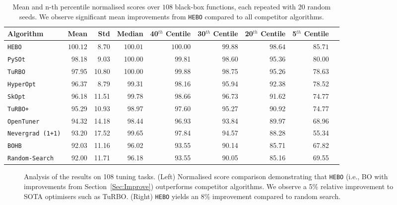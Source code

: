 \documentclass[jair,twoside,11pt,theapa]{article}
\theoremstyle{definition}
\begin{document}
    \begin{table}[t!]
    \centering
\begin{tabular}{lrrrrrrrr}
\toprule
      Algorithm &    Mean &    Std &     Median &     40$^{th}$ Centile &    30$^{th}$ Centile &    20$^{th}$ Centile &  5$^{th}$ Centile \\
\midrule
          \texttt{HEBO} &  $\bm{100.12}$ &   $\bm{8.70}$ &  $\bm{100.01}$ &  $\bm{100.00}$ &  $\bm{99.88}$ &  $\bm{98.64}$ &  $\bm{85.71}$ \\
          \texttt{PySOt} &   98.18 &   9.03 &  100.00 &   99.81 &  98.60 &  95.36 &  80.00 \\
          \texttt{TuRBO} &   97.95 &  10.80 &  100.00 &   99.88 &  98.75 &  95.26 &  78.63 \\
       \texttt{HyperOpt} &   96.37 &   8.79 &   99.31 &   98.16 &  95.94 &  92.38 &   78.52 \\
          \texttt{SkOpt} &   96.18 &  11.51 &   99.78 &   98.66 &  96.73 &  91.62 &  74.77 \\
\texttt{TuRBO+} &   95.29 &  10.93 &   98.97 &   97.60 &  95.27 &  90.92  &  74.77 \\
      \texttt{OpenTuner} &   94.32 &  14.18 &   98.44 &   96.93 &  93.84 &  89.97  &  68.96 \\
\texttt{Nevergrad (1+1)} &   93.20 &  17.52 &   99.65 &   97.84 &  94.57 &  88.28 &  55.34 \\
\texttt{BOHB} &   92.03 &  11.16  &  96.02 &  93.55 &  90.14  & 85.71   & 67.82 \\
  \texttt{Random-Search} &   92.00 &  11.71 &   96.18 &   93.55 &  90.05 &  85.16  &  69.55 \\
\bottomrule
\end{tabular}
    \caption{Mean and n-th percentile normalised scores over $108$ black-box functions, each repeated with 20 random seeds. We observe significant mean improvements from \texttt{HEBO} compared to all competitor algorithms.
}
    \label{tab:summary-perf-compare}
\end{table}




\begin{figure*}\centering
{}\caption{Analysis of the results on 108 tuning tasks. (Left) Normalised score comparison demonstrating that \texttt{HEBO} (i.e., BO with improvements from Section~\ref{Sec:Improve}) outperforms competitor algorithms. We observe a 5\% relative improvement to SOTA optimisers such as TuRBO. (Right) \texttt{HEBO} yields an 8\% improvement compared to random search.}
\label{Fig:ResOne1}
\end{figure*}
\end{document}
